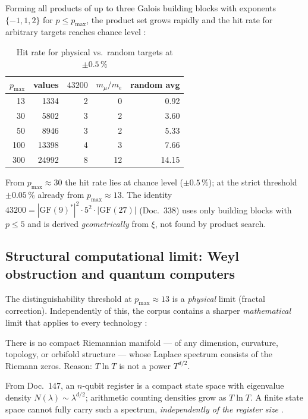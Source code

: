 Forming all products of up to three Galois building blocks with exponents
$\{-1, 1, 2\}$ for $p \leq p_\mathrm{max}$, the product set grows rapidly
and the hit rate for arbitrary targets reaches chance level \BM:

\begin{table}[H]
\centering
\caption{Hit rate for physical vs.\ random targets at $\pm 0.5\,\%$}
\begin{tabular}{rrrrr}
\toprule
$p_\mathrm{max}$ & values & $43200$ & $m_\mu/m_e$ & random avg \\
\midrule
13  & 1334  & 2 & 0 & 0.92 \\
30  & 5802  & 3 & 2 & 3.60 \\
50  & 8946  & 3 & 2 & 5.33 \\
100 & 13398 & 4 & 3 & 7.66 \\
300 & 24992 & 8 & 12 & 14.15 \\
\bottomrule
\end{tabular}
\end{table}

From $p_\mathrm{max} \approx 30$ the hit rate lies at chance level
($\pm 0.5\,\%$); at the strict threshold $\pm 0.05\,\%$ already from
$p_\mathrm{max} \approx 13$. The identity
$43200 = |\mathrm{GF}(9)^*|^2 \cdot 5^2 \cdot |\mathrm{GF}(27)|$
(Doc.~338) uses only building blocks with $p \leq 5$ and is derived
\emph{geometrically} from $\xi$, not found by product search.

\subsection{Structural computational limit: Weyl obstruction and quantum computers}

The distinguishability threshold at $p_\mathrm{max} \approx 13$ is a
\emph{physical} limit (fractal correction). Independently of this, the corpus
contains a sharper \emph{mathematical} limit that applies to every technology \BM:

\begin{keyresult}
There is no compact Riemannian manifold — of any dimension, curvature,
topology, or orbifold structure — whose Laplace spectrum consists of the
Riemann zeros. Reason: $T\ln T$ is not a power $T^{d/2}$.
\end{keyresult}

From Doc.~147, an $n$-qubit register is a compact state space with eigenvalue
density $N(\lambda) \sim \lambda^{d/2}$; arithmetic counting densities grow
as $T \ln T$. A finite state space cannot fully carry such a spectrum,
\emph{independently of the register size} \BM.

